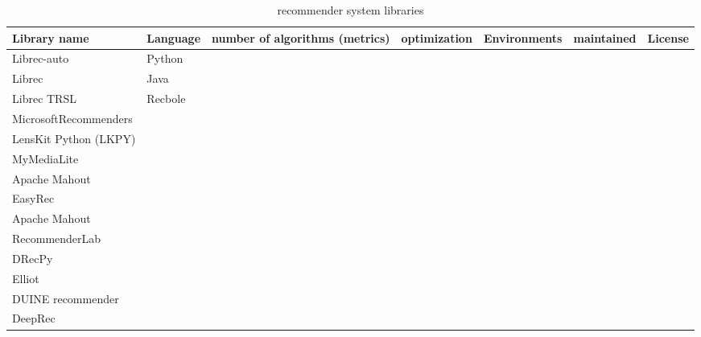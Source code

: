 \begin{table}[tb]
\centering
\caption{recommender system libraries}
\label{tab:fair_libs}
\begin{tabular}{lllllll}
\toprule
Library name        & Language      & number of algorithms (metrics)      & optimization       & Environments    & maintained      & License\\\midrule
Librec-auto         & Python           &  \\
Librec              & Java             &  \\
Librec TRSL &
Recbole        &              &  \\
MicrosoftRecommenders         &              &  \\
LensKit Python (LKPY)            &  \\
MyMediaLite                &  &  \\

Apache Mahout             &  \\
EasyRec             &  \\
Apache Mahout             &  \\
RecommenderLab             &  \\
DRecPy              &   \\
Elliot              & \\
DUINE recommender   & \\
DeepRec     &\\


\bottomrule
                                 
\end{tabular}
\end{table}


